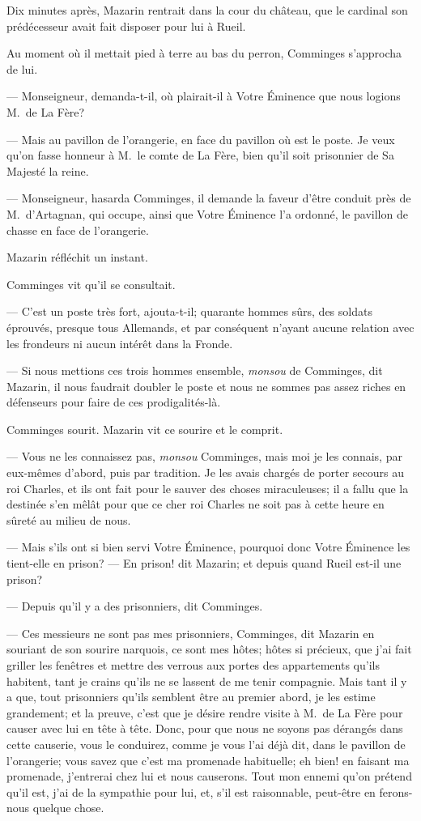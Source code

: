 Dix minutes après, Mazarin rentrait dans la cour du château, que le cardinal son prédécesseur avait fait disposer pour lui à Rueil.

Au moment où il mettait pied à terre au bas du perron, Comminges s'approcha de lui.

— Monseigneur, demanda-t-il, où plairait-il à Votre Éminence que nous logions M.~de La Fère?

— Mais au pavillon de l'orangerie, en face du pavillon où est le poste. Je veux qu'on fasse honneur à M.~le comte de La Fère, bien qu'il soit prisonnier de Sa Majesté la reine.

— Monseigneur, hasarda Comminges, il demande la faveur d'être conduit près de M.~d'Artagnan, qui occupe, ainsi que Votre Éminence l'a ordonné, le pavillon de chasse en face de l'orangerie.

Mazarin réfléchit un instant.

Comminges vit qu'il se consultait.

— C'est un poste très fort, ajouta-t-il; quarante hommes sûrs, des soldats éprouvés, presque tous Allemands, et par conséquent n'ayant aucune relation avec les frondeurs ni aucun intérêt dans la Fronde.

— Si nous mettions ces trois hommes ensemble, \textit{monsou} de Comminges, dit Mazarin, il nous faudrait doubler le poste et nous ne sommes pas assez riches en défenseurs pour faire de ces prodigalités-là.

Comminges sourit. Mazarin vit ce sourire et le comprit.

— Vous ne les connaissez pas, \textit{monsou} Comminges, mais moi je les connais, par eux-mêmes d'abord, puis par tradition. Je les avais chargés de porter secours au roi Charles, et ils ont fait pour le sauver des choses miraculeuses; il a fallu que la destinée s'en mêlât pour que ce cher roi Charles ne soit pas à cette heure en sûreté au milieu de nous.

— Mais s'ils ont si bien servi Votre Éminence, pourquoi donc Votre Éminence les tient-elle en prison?
— En prison! dit Mazarin; et depuis quand Rueil est-il une prison?

— Depuis qu'il y a des prisonniers, dit Comminges.

— Ces messieurs ne sont pas mes prisonniers, Comminges, dit Mazarin en souriant de son sourire narquois, ce sont mes hôtes; hôtes si précieux, que j'ai fait griller les fenêtres et mettre des verrous aux portes des appartements qu'ils habitent, tant je crains qu'ils ne se lassent de me tenir compagnie. Mais tant il y a que, tout prisonniers qu'ils semblent être au premier abord, je les estime grandement; et la preuve, c'est que je désire rendre visite à M.~de La Fère pour causer avec lui en tête à tête. Donc, pour que nous ne soyons pas dérangés dans cette causerie, vous le conduirez, comme je vous l'ai déjà dit, dans le pavillon de l'orangerie; vous savez que c'est ma promenade habituelle; eh bien! en faisant ma promenade, j'entrerai chez lui et nous causerons. Tout mon ennemi qu'on prétend qu'il est, j'ai de la sympathie pour lui, et, s'il est raisonnable, peut-être en ferons-nous quelque chose.

